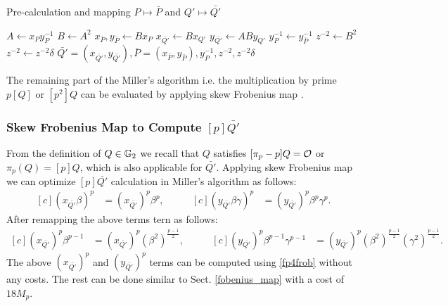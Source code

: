 \begin{algorithm}[!htp]
	\caption{Pre-calculation and mapping $P \mapsto\bar{P}$ and $Q'\mapsto \bar{Q'}$}
	\label{pre_calc_Algo}
	\DontPrintSemicolon
	\hspace{-3ex}
	\hspace{-3ex}
	
	\nl $A \leftarrow x_Py_P^{-1}$ 
	\nl $B \leftarrow A^{2}$  
	\nl $x_{\bar{P}}, y_{\bar{P}} \leftarrow Bx_P$  
	\nl $x_{\bar{Q'}} \leftarrow Bx_{Q'}$ 
	\nl $y_{\bar{Q'}} \leftarrow ABy_{Q'}$ 
	\nl $y_P^{-1} \leftarrow y_{\bar{P}}^{-1}$ 
	\nl $z^{-2} \leftarrow B^2$ 
	\nl $z^{-2} \leftarrow z^{-2}\delta$  
	 $\bar{Q'}=(x_{\bar{Q'}},y_{\bar{Q'}}),\bar{P} = (x_{\bar{P}}, y_{\bar{P}}), y_{P}^{-1}, z^{-2},  z^{-2}\delta $\;
\end{algorithm}
\vspace{8mm}
The remaining part of the Miller's algorithm i.e. the multiplication by prime $p[Q]$ or $[p^2]Q$ can be evaluated by applying skew Frobenius map  \cite{CANS:SNOKM08}.
\subsubsection{Skew Frobenius Map to Compute $[p]\bar{Q'}$}\label{sec_tskew_fm}
From the definition of $Q \in {\mathbb{G}}_{2}$ we recall that $Q$ satisfies $[\pi_p -p]Q = \cal O$ or $\pi_p(Q) = [p]Q$, which is also applicable for $\bar{Q'}$.
Applying skew Frobenius map we can optimize $[p]\bar{Q'}$ calculation in Miller's algorithm as follows:
\begin{equation*}
\begin{aligned}[c]
(x_{\bar{Q'}}\beta)^p  &=  (x_{\bar{Q'}})^p \beta^p, \nonumber
\end{aligned}
\qquad
\begin{aligned}[c]
(y_{\bar{Q'}}\beta\gamma )^p  &=   (y_{\bar{Q'}})^p \beta^p \gamma^p.  \nonumber 
\end{aligned}
\end{equation*}
After remapping the above terms tern as follows:
\begin{equation*}
\begin{aligned}[c]
(x_{\bar{Q'}})^p \beta^{p-1} & =   (x_{\bar{Q'}})^p (\beta^2)^{\frac{p-1}{2}},
\end{aligned}
\qquad
\begin{aligned}[c]
 (y_{\bar{Q'}})^p \beta^{p-1} \gamma^{p-1}  & = (y_{\bar{Q'}})^p (\beta^2)^{\frac{p-1}{2}} (\gamma^2)^{\frac{p-1}{2}}.
\end{aligned}
\end{equation*}
The above $(x_{\bar{Q'}})^p$ and $(y_{\bar{Q'}})^p$ terms can be computed using \eqref{fp4frob} without any costs.
The rest can be done similar to Sect. \ref{fobenius_map} with a cost of $18M_p$.

